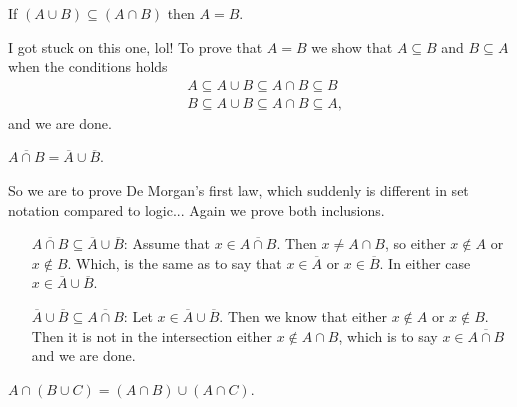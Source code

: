 \documentclass[a4paper, english, 12pt]{article} %
\begin{document}
\begin{subproblem}
  If $(A \cup B) \subseteq (A \cap B)$ then $A = B$.
\end{subproblem}

\begin{answer}
  I got stuck on this one, lol! To prove that $A = B$ we show that $A \subseteq
  B$ and $B \subseteq A$ when the conditions holds
  \begin{align*}
    & A \subseteq A \cup B \subseteq A \cap B \subseteq B  \\
    & B \subseteq A \cup B \subseteq A \cap B \subseteq A,
  \end{align*}
  and we are done.
\end{answer}

\begin{subproblem}
  $\overline{A \cap B} = \overline{A} \cup \overline{B}$.
\end{subproblem}

\begin{answer}
  So we are to prove De Morgan's first law, which suddenly is different in set
  notation compared to logic... Again we prove both inclusions.
  \begin{enumerate}[align=left]
    \item[$ \overline{A \cap B} \subseteq \overline{A} \cup \overline{B}$:]
   Assume that $x \in \overline{A \cap B}$. Then $x \neq A \cap B$, so either
   $x\not \in A$ or $x \not \in B$. Which, is the same as to say that $x
  \in \overline{A}$ or $x \in \overline{B}$. In either case $x \in \overline{A}
  \cup \overline{B}$.
  \item[$\overline{A} \cup \overline{B} \subseteq \overline{A \cap B}$:]
    Let $x \in \overline{A} \cup \overline{B}$. Then we know that either $x \not
    \in A$ or $x \not \in B$. Then it is not in the intersection either $x \not
      \in A \cap B$, which is to say $x \in \overline{A \cap B}$ and we are done.
      \end{enumerate}
\end{answer}

\begin{subproblem}
  $A \cap (B \cup C) = (A \cap B) \cup (A \cap C)$.
\end{subproblem}
\end{document}
